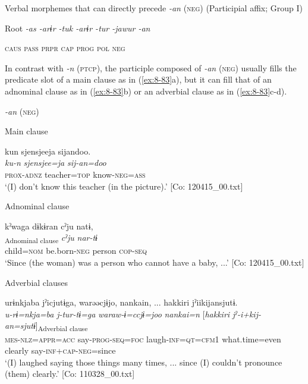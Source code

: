 \ea\label{ex:8-82}
  Verbal morphemes that can directly precede \textit{-an} (\textsc{neg}) (Participial affix; Group I)

  Root  \textit{-as  -arɨr  -tuk  -arɨr  -tur  -jawur  -an}

    \textsc{caus}  \textsc{pass}  \textsc{prpr}  \textsc{cap}  \textsc{prog}  \textsc{pol}  \textsc{neg}
\z

In contrast with \textit{-n} (\textsc{ptcp}), the participle composed of \textit{-an} (\textsc{neg}) usually fills the predicate slot of a main clause as in (\ref{ex:8-83}a), but it can fill that of an adnominal clause as in (\ref{ex:8-83}b) or an adverbial clause as in (\ref{ex:8-83}c-d).

\ea\label{ex:8-83}
  \textit{-an} (\textsc{neg})

  Main clause

\ea
{\TM}
\glll  kun  {\textbar}sjensjee{\textbar}ja  sijandoo.\\
\textit{ku-n}  \textit{sjensjee=ja}  \textit{sij-an=doo}\\
\textsc{prox}-\textsc{adnz}  teacher=\textsc{top}  know-\textsc{neg}=\textsc{ass}\\
\glt ‘(I) don’t know this teacher (in the picture).’ [Co: 120415\_00.txt]

  Adnominal clause

\ex
{\TM}
\glll  kˀwaga  dɨkɨran  cˀju  natɨ,\\
[\textit{kˀwa=ga}  \textit{dɨkɨr-an}]\textsubscript{Adnominal clause}  \textit{cˀju}  \textit{nar-tɨ}\\
     child=\textsc{nom}  be.born-\textsc{neg}  person  \textsc{cop}-\textsc{seq}\\
\glt ‘Since (the woman) was a person who cannot have a baby, ...’ [Co: 120415\_00.txt]

  Adverbial clauses

\ex
{\TM}
\glll  urɨnkjaba  jˀicjutɨga,  warəəcjɨjo,      {\textbar}nankai{\textbar}n, ...  {\textbar}hakkiri{\textbar}  jˀiikijansjutɨ.\\
\textit{u-rɨ=nkja=ba}  \textit{j-tur-tɨ=ga}  \textit{waraw-ɨ=ccjɨ=joo}      \textit{nankai=n}  [\textit{hakkiri}  \textit{jˀ-i+kij-an=sjutɨ}]\textsubscript{Adverbial clause}\\
\textsc{mes}-\textsc{nlz}=\textsc{appr}=\textsc{acc}  say-\textsc{prog}-\textsc{seq}=\textsc{foc}  laugh-\textsc{inf}=\textsc{qt}=\textsc{cfm1}  what.time=even  clearly  say-\textsc{inf}+\textsc{cap}-\textsc{neg}=since\\
\glt ‘(I) laughed saying those things many times, ... since (I) couldn’t pronounce (them) clearly.’ [Co: 110328\_00.txt]

